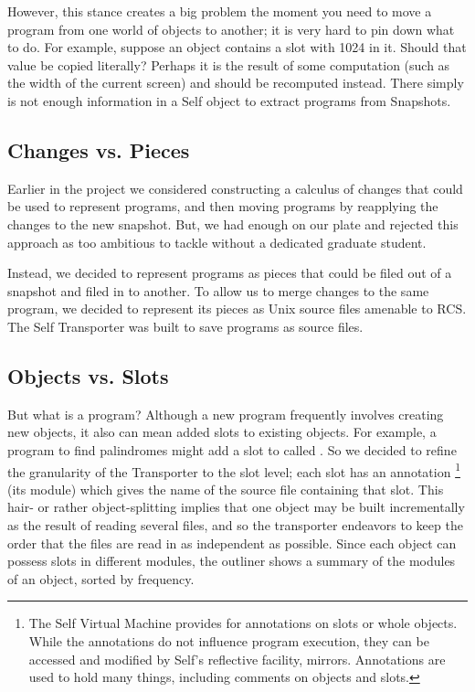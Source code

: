 \documentclass[letterpaper,10pt,english]{sphinxmanual}
\begin{document}
However, this stance creates a big problem the moment you need to move a program from one
world of objects to another; it is very hard to pin down what to do. For example, suppose an object
contains a slot with 1024 in it. Should that value be copied literally? Perhaps it is the result of some
computation (such as the width of the current screen) and should be recomputed instead. There
simply is not enough information in a Self object to extract programs from Snapshots.


\subsection{Changes vs. Pieces}
\label{howtoprg:changes-vs-pieces}
Earlier in the project we considered constructing a calculus of changes that could be used to represent
programs, and then moving programs by reapplying the changes to the new snapshot. But, we
had enough on our plate and rejected this approach as too ambitious to tackle without a dedicated
graduate student.

Instead, we decided to represent programs as pieces that could be filed out of a snapshot and filed
in to another. To allow us to merge changes to the same program, we decided to represent its pieces
as Unix source files amenable to RCS. The Self Transporter was built to save programs as source
files.


\subsection{Objects vs. Slots}
\label{howtoprg:objects-vs-slots}
But what is a program? Although a new program frequently involves creating new objects, it also
can mean added slots to existing objects. For example, a program to find palindromes might add a
slot to  called . So we decided to refine the granularity of the
Transporter to the slot level; each slot has an annotation \footnote{
The Self Virtual Machine provides for annotations on slots or whole objects. While the annotations do not influence program execution, they can be accessed and modified by Self’s reflective facility, mirrors. Annotations are used to hold many things, including comments on objects and slots.
} (its module) which gives the name of the
source file containing that slot. This hair- or rather object-splitting implies that one object may be
built incrementally as the result of reading several files, and so the transporter endeavors to keep
the order that the files are read in as independent as possible. Since each object can possess slots
in different modules, the outliner shows a summary of the modules of an object, sorted by frequency.
\end{document}

